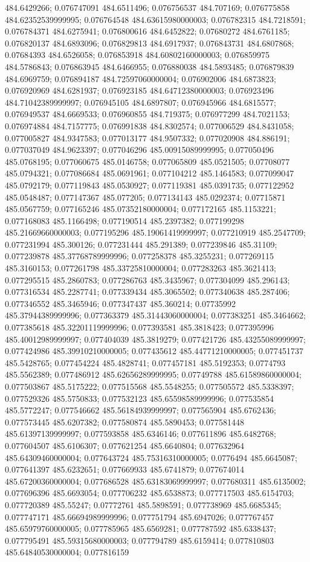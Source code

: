 484.6429266; 0.076747091 484.6511496; 0.076756537 484.707169; 0.076775858 484.62352539999995; 0.076764548 484.63615980000003; 0.076782315 484.7218591; 0.076784371 484.6275941; 0.076800616 484.6452822; 0.07680272 484.6761185; 0.076820137 484.6893096; 0.076829813 484.6917937; 0.076843731 484.6807868; 0.07684393 484.6526058; 0.076853918 484.60802160000003; 0.076859975 484.5786843; 0.076863945 484.6466955; 0.076880038 484.5893485; 0.076879839 484.6969759; 0.076894187 484.72597060000004; 0.076902006 484.6873823; 0.076920969 484.6281937; 0.076923185 484.64712380000003; 0.076923496 484.71042389999997; 0.076945105 484.6897807; 0.076945966 484.6815577; 0.076949537 484.6669533; 0.076960855 484.719375; 0.076977299 484.7021153; 0.076974884 484.7157775; 0.076991838 484.8302574; 0.077006529 484.8431058; 0.077005827 484.9347583; 0.077013177 484.9507332; 0.077020908 484.886191; 0.077037049 484.9623397; 0.077046296 485.00915089999995; 0.077050496 485.0768195; 0.077060675 485.0146758; 0.077065809 485.0521505; 0.07708077 485.0794321; 0.077086684 485.0691961; 0.077104212 485.1464583; 0.077099047 485.0792179; 0.077119843 485.0530927; 0.077119381 485.0391735; 0.077122952 485.0548487; 0.077147367 485.077205; 0.077134143 485.0292374; 0.07715871 485.0567759; 0.077165246 485.07352180000004; 0.077172165 485.1153221; 0.077168083 485.1166498; 0.077190514 485.2397382; 0.077199298 485.21669660000003; 0.077195296 485.19061419999997; 0.077210919 485.2547709; 0.077231994 485.300126; 0.077231444 485.291389; 0.077239846 485.31109; 0.077239878 485.37768789999996; 0.077258378 485.3255231; 0.077269115 485.3160153; 0.077261798 485.33725810000004; 0.077283263 485.3621413; 0.077295515 485.2860783; 0.077286763 485.3435967; 0.077304099 485.296143; 0.077316534 485.2287741; 0.077339434 485.3065502; 0.077340638 485.287406; 0.077346552 485.3465946; 0.077347437 485.360214; 0.07735992 485.37944389999996; 0.077363379 485.31443060000004; 0.077383251 485.3464662; 0.077385618 485.32201119999996; 0.077393581 485.3818423; 0.077395996 485.40012989999997; 0.077404039 485.3819279; 0.077421726 485.43255089999997; 0.077424986 485.39910210000005; 0.077435612 485.44771210000005; 0.077451737 485.5428765; 0.077454224 485.4828741; 0.077457181 485.5192353; 0.0774793 485.5562389; 0.077486912 485.62656289999995; 0.07749788 485.61589860000004; 0.077503867 485.5175222; 0.077515568 485.5548255; 0.077505572 485.5338397; 0.077529326 485.5750833; 0.077532123 485.65598589999996; 0.077535854 485.5772247; 0.077546662 485.56184939999997; 0.077565904 485.6762436; 0.077573445 485.6207382; 0.077580874 485.5890453; 0.077581448 485.61397139999997; 0.077593858 485.6346146; 0.077611896 485.6482768; 0.077604507 485.6106307; 0.077621254 485.6640804; 0.077632964 485.64309460000004; 0.077643724 485.75316310000005; 0.0776494 485.6645087; 0.077641397 485.6232651; 0.077669933 485.6741879; 0.077674014 485.67200360000004; 0.077686528 485.63183069999997; 0.077680311 485.6135002; 0.077696396 485.6693054; 0.077706232 485.6538873; 0.077717503 485.6154703; 0.077720389 485.55247; 0.07772761 485.5898591; 0.077738969 485.6685345; 0.077747171 485.66694989999996; 0.077751794 485.6947026; 0.077767457 485.65979760000005; 0.077785965 485.6569281; 0.077787592 485.6338437; 0.077795491 485.59315680000003; 0.077794789 485.6159414; 0.077810803 485.64840530000004; 0.077816159 